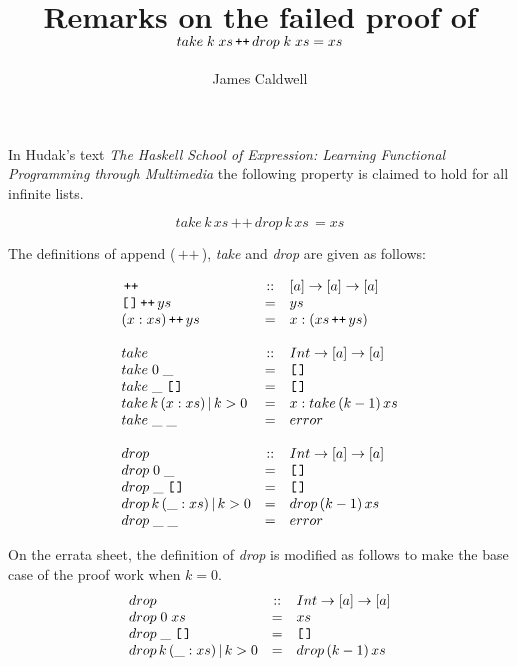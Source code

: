 \documentclass[11pt]{article}
\title{Remarks on the failed proof of \\$take\; k\; xs \append drop\; k\; xs = xs$}
\author{James Caldwell}
\newcommand{\append}{\,{\texttt{++}}\,}
\newcommand{\nil}{{\texttt{[{\hspace{.125em}}]}}}
\begin{document}
\maketitle

In Hudak's text {\em{The Haskell School of Expression: Learning Functional
Programming through Multimedia}} \cite{hudak} the following property is claimed
to hold for all infinite lists.

\[take\, k\, xs \append{}drop\, k\, xs\,  = xs\]

The definitions of append ($\append$)\cite[pp.330]{hudak}, {\it{take}}
\cite[pp. 324]{hudak} and {\it{drop}} \cite[pp.324]{hudak} are given as
follows:


\[\begin{array}{lcl}
 \append{} &  :: & [a] \rightarrow [a] \rightarrow [a] \\
 \nil \append{} ys  & = &  ys \\
 (x:xs) \append{} ys  & = &  x:(xs\append{}ys) \\
\ \\
 take &  :: & Int \rightarrow [a] \rightarrow [a] \\
 take\; 0\; \_ & = &  \nil \\
 take\; \_ \;\nil & = &  \nil \\
 take\, k\, (x:xs)\, |\, k > 0 & = &  x:take\, (k-1)\, xs \\
 take\; \_ \;\_ & = &  error  \\
\ \\
 drop &  :: & Int \rightarrow [a] \rightarrow [a] \\
 drop\; 0\; \_ & = &  \nil \\
 drop\; \_ \;\nil & = &  \nil \\
 drop\, k\, (\_:xs)\, |\, k > 0 & = &  drop\, (k-1)\, xs \\
 drop\; \_ \;\_ & = &  error  \\
\end{array}\]

On the errata sheet, the definition of {\it{drop}} is modified as follows to
make the base case of the proof work when $k=0$.
\[\begin{array}{lcl}
 drop &  :: & Int \rightarrow [a] \rightarrow [a] \\
 drop\; 0\; xs & = &  xs \\
 drop\; \_ \;\nil & = &  \nil \\
 drop\, k\, (\_:xs)\, |\, k > 0 & = &  drop\, (k-1)\, xs \\

\end{array}\]
\end{document}
